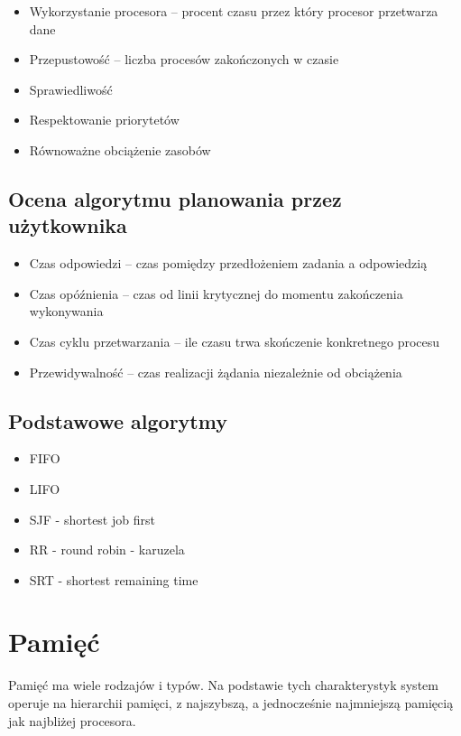 \documentclass{../notatki}
\begin{document}
\begin{itemize}
  \item Wykorzystanie procesora – procent czasu przez który procesor
    przetwarza dane
  \item Przepustowość – liczba procesów zakończonych w czasie
  \item Sprawiedliwość
  \item Respektowanie priorytetów
  \item Równoważne obciążenie zasobów
\end{itemize}

\subsection{Ocena algorytmu planowania przez użytkownika}

\begin{itemize}
  \item Czas odpowiedzi – czas pomiędzy przedłożeniem zadania a odpowiedzią
  \item Czas opóźnienia – czas od linii krytycznej do momentu
    zakończenia wykonywania
  \item Czas cyklu przetwarzania – ile czasu trwa skończenie konkretnego procesu
  \item Przewidywalność – czas realizacji żądania niezależnie od obciążenia
\end{itemize}

\subsection{Podstawowe algorytmy}

\begin{itemize}
  \item FIFO
  \item LIFO
  \item SJF - shortest job first
  \item RR - round robin - karuzela
  \item SRT - shortest remaining time
\end{itemize}

\section{Pamięć}

Pamięć ma wiele rodzajów i typów. Na podstawie tych charakterystyk
system operuje
na hierarchii pamięci, z najszybszą, a jednocześnie najmniejszą
pamięcią jak najbliżej procesora.
\end{document}
